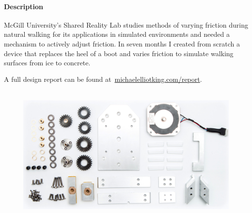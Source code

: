 \documentclass[12pt, landscape]{article}
\begin{document}
		\paragraph{Description} McGill University's Shared Reality Lab studies methods of varying friction during natural walking for its applications in simulated environments and needed a mechanism to actively adjust friction. In seven months I created from scratch a device that replaces the heel of a boot and varies friction to simulate walking surfaces from ice to concrete.  

		A full design report can be found at~\href{http://michaelelliotking.com/report}{michaelelliotking.com/report}.
		\begin{figure}[H]
			\centering
			\includegraphics[height=2.75in]{media/shoe_components}
			\label{components}
		\end{figure}
\end{document}
